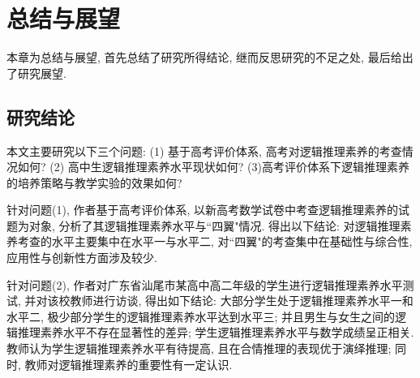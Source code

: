 \documentclass[acaddeg]{Style/SCNUThesisV3}
\begin{document}
\chapter{总结与展望}\label{Cha: 7}
\setcounter{equation}{0}
本章为总结与展望, 首先总结了研究所得结论, 继而反思研究的不足之处, 最后给出了研究展望. 
\section{研究结论}
本文主要研究以下三个问题:  (1) 基于高考评价体系, 高考对逻辑推理素养的考查情况如何? (2) 高中生逻辑推理素养水平现状如何? (3)高考评价体系下逻辑推理素养的培养策略与教学实验的效果如何?

 针对问题(1), 作者基于高考评价体系, 以新高考数学试卷中考查逻辑推理素养的试题为对象, 分析了其逻辑推理素养水平与``四翼"情况. 得出以下结论: 对逻辑推理素养考查的水平主要集中在水平一与水平二, 对``四翼"的考查集中在基础性与综合性, 应用性与创新性方面涉及较少.
 
针对问题(2), 作者对广东省汕尾市某高中高二年级的学生进行逻辑推理素养水平测试, 并对该校教师进行访谈, 得出如下结论: 大部分学生处于逻辑推理素养水平一和水平二, 极少部分学生的逻辑推理素养水平达到水平三; 并且男生与女生之间的逻辑推理素养水平不存在显著性的差异; 学生逻辑推理素养水平与数学成绩呈正相关. 教师认为学生逻辑推理素养水平有待提高, 且在合情推理的表现优于演绎推理; 同时, 教师对逻辑推理素养的重要性有一定认识. 
 
\backmatter %
 \fancyhead[C]{  } 
 \renewcommand{\headrulewidth}{0pt} 


\cleardoublepage
{}



 
%
%
%
%
%
\end{document}
